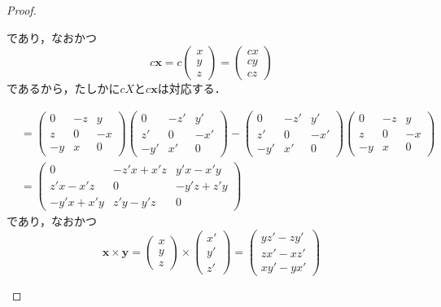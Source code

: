 \documentclass[a4paper,10pt,fleqn]{ltjsarticle}
\begin{document}
\begin{leftbar}
\begin{proof}
\begin{description}
\[            \]
            であり，なおかつ
            \[
              c\bm{x} = c\begin{pmatrix} x \\ y \\ z \end{pmatrix} = \begin{pmatrix} cx \\ cy \\ cz \end{pmatrix}
            \]
            であるから，たしかに$cX$と$c\bm{x}$は対応する．
      \item [【\text{$[X,Y]$と$\bm{x} \times \bm{y}$について】}]
            \begin{align*}
              [X,Y] & =\begin{pmatrix} 0 & -z & y \\ z & 0 & -x \\ -y & x & 0 \end{pmatrix}\begin{pmatrix} 0 & -z ' & y ' \\ z' & 0 & -x' \\ -y' & x ' & 0 \end{pmatrix}-\begin{pmatrix} 0 & -z ' & y ' \\ z' & 0 & -x' \\ -y' & x ' & 0 \end{pmatrix} \begin{pmatrix} 0 & -z & y \\ z & 0 & -x \\ -y & x & 0 \end{pmatrix} \\
                    & = \begin{pmatrix} 0 & -z'x+x'z & y'x-x'y \\ z'x-x'z & 0 & -y'z+z'y \\ -y'x+x'y & z'y-y'z & 0 \end{pmatrix}
            \end{align*}
            であり，なおかつ
            \[
              \bm{x}\times \bm{y} = \begin{pmatrix} x \\ y \\ z \end{pmatrix} \times \begin{pmatrix} x' \\ y ' \\ z' \end{pmatrix} = \begin{pmatrix} yz'-zy' \\ zx'-xz' \\ xy'-yx' \end{pmatrix}
\]
\end{description}
\end{proof}
\end{leftbar}
\end{document}
